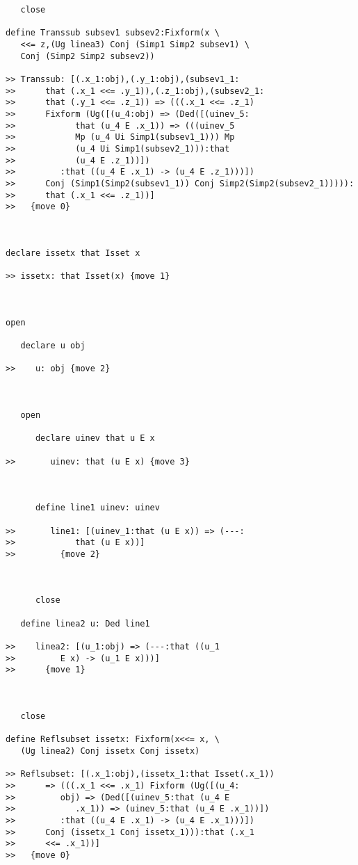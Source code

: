\documentclass[12pt]{article}
\begin{document}
\begin{verbatim}
   close

define Transsub subsev1 subsev2:Fixform(x \
   <<= z,(Ug linea3) Conj (Simp1 Simp2 subsev1) \
   Conj (Simp2 Simp2 subsev2))

>> Transsub: [(.x_1:obj),(.y_1:obj),(subsev1_1:
>>      that (.x_1 <<= .y_1)),(.z_1:obj),(subsev2_1:
>>      that (.y_1 <<= .z_1)) => (((.x_1 <<= .z_1)
>>      Fixform (Ug([(u_4:obj) => (Ded([(uinev_5:
>>            that (u_4 E .x_1)) => (((uinev_5
>>            Mp (u_4 Ui Simp1(subsev1_1))) Mp
>>            (u_4 Ui Simp1(subsev2_1))):that
>>            (u_4 E .z_1))])
>>         :that ((u_4 E .x_1) -> (u_4 E .z_1)))])
>>      Conj (Simp1(Simp2(subsev1_1)) Conj Simp2(Simp2(subsev2_1))))):
>>      that (.x_1 <<= .z_1))]
>>   {move 0}



declare issetx that Isset x

>> issetx: that Isset(x) {move 1}



open

   declare u obj

>>    u: obj {move 2}



   open

      declare uinev that u E x

>>       uinev: that (u E x) {move 3}



      define line1 uinev: uinev

>>       line1: [(uinev_1:that (u E x)) => (---:
>>            that (u E x))]
>>         {move 2}



      close

   define linea2 u: Ded line1

>>    linea2: [(u_1:obj) => (---:that ((u_1
>>         E x) -> (u_1 E x)))]
>>      {move 1}



   close

define Reflsubset issetx: Fixform(x<<= x, \
   (Ug linea2) Conj issetx Conj issetx)

>> Reflsubset: [(.x_1:obj),(issetx_1:that Isset(.x_1))
>>      => (((.x_1 <<= .x_1) Fixform (Ug([(u_4:
>>         obj) => (Ded([(uinev_5:that (u_4 E
>>            .x_1)) => (uinev_5:that (u_4 E .x_1))])
>>         :that ((u_4 E .x_1) -> (u_4 E .x_1)))])
>>      Conj (issetx_1 Conj issetx_1))):that (.x_1
>>      <<= .x_1))]
>>   {move 0}




\end{verbatim}
\end{document}
